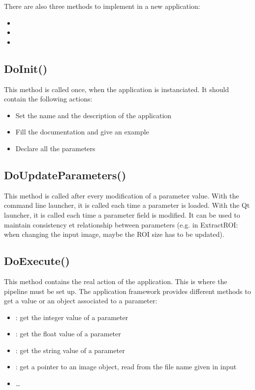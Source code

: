 There are also three methods to implement in a new application:
\begin{itemize}
  \item {}
  \item {}
  \item {}
\end{itemize}

\subsection{DoInit()}
\label{sec:appDoInit}
This method is called once, when the application is instanciated. It should 
contain the following actions:
\begin{itemize}
  \item Set the name and the description of the application
  \item Fill the documentation and give an example
  \item Declare all the parameters
\end{itemize}


\subsection{DoUpdateParameters()}
\label{sec:appDoUpdateParameters}
This method is called after every modification of a parameter value. With the command 
line launcher, it is called each time a parameter is loaded. With the Qt launcher, it
is called each time a parameter field is modified. It can be used to maintain consistency et relationship
between parameters (e.g. in ExtractROI: when changing the input image, maybe the ROI size 
has to be updated).

\subsection{DoExecute()}
\label{sec:appDoExecute}
This method contains the real action of the application. This is where the pipeline 
must be set up. The application framework provides different methods to get a value 
or an object associated to a parameter:
\begin{itemize}
  \item {} : get the integer value of a parameter
  \item {} : get the float value of a parameter
  \item {} : get the string value of a parameter
  \item {} : get a pointer to an image object, read from the
  file name given in input
  \item \dots
\end{itemize}

